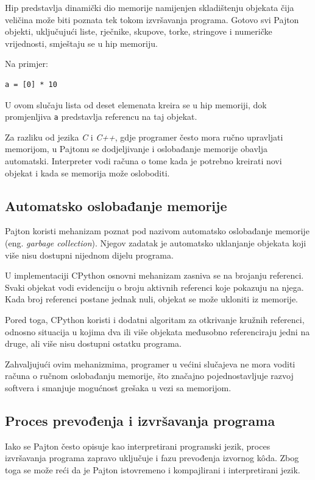 Hip predstavlja dinamički dio memorije namijenjen skladištenju objekata čija veličina može biti poznata tek tokom izvršavanja programa. Gotovo svi Pajton objekti, uključujući liste, rječnike, skupove, torke, stringove i numeričke vrijednosti, smještaju se u hip memoriju.

Na primjer:
\begin{verbatim}
a = [0] * 10
\end{verbatim}

U ovom slučaju lista od deset elemenata kreira se u hip memoriji, dok promjenljiva \texttt{a} predstavlja referencu na taj objekat.

Za razliku od jezika \textit{C} i \textit{C++}, gdje programer često mora ručno upravljati memorijom, u Pajtonu se dodjeljivanje i oslobađanje memorije obavlja automatski. Interpreter vodi računa o tome kada je potrebno kreirati novi objekat i kada se memorija može osloboditi.

\subsection{Automatsko oslobađanje memorije}

Pajton koristi mehanizam poznat pod nazivom automatsko oslobađanje memorije (eng. \textit{garbage collection}). Njegov zadatak je automatsko uklanjanje objekata koji više nisu dostupni nijednom dijelu programa.

U implementaciji CPython osnovni mehanizam zasniva se na brojanju referenci. Svaki objekat vodi evidenciju o broju aktivnih referenci koje pokazuju na njega. Kada broj referenci postane jednak nuli, objekat se može ukloniti iz memorije.

Pored toga, CPython koristi i dodatni algoritam za otkrivanje kružnih referenci, odnosno situacija u kojima dva ili više objekata međusobno referenciraju jedni na druge, ali više nisu dostupni ostatku programa.

Zahvaljujući ovim mehanizmima, programer u većini slučajeva ne mora voditi računa o ručnom oslobađanju memorije, što značajno pojednostavljuje razvoj softvera i smanjuje mogućnost grešaka u vezi sa memorijom.

\subsection{Proces prevođenja i izvršavanja programa}

Iako se Pajton često opisuje kao interpretirani programski jezik, proces izvršavanja programa zapravo uključuje i fazu prevođenja izvornog k\^oda. Zbog toga se može reći da je Pajton istovremeno i kompajlirani i interpretirani jezik.

